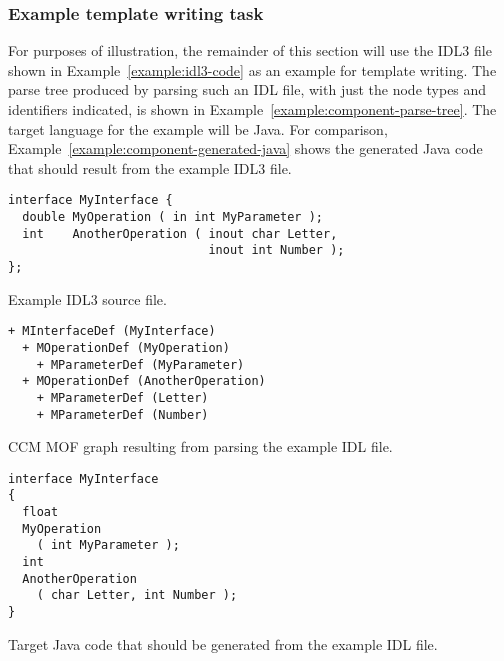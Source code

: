 \subsubsection{Example template writing task}

For purposes of illustration, the remainder of this section will use the IDL3
file shown in Example~\ref{example:idl3-code} as an example for template
writing. The parse tree produced by parsing such an IDL file, with just the node
types and identifiers indicated, is shown in
Example~\ref{example:component-parse-tree}. The target language for the example
will be Java. For comparison, Example~\ref{example:component-generated-java}
shows the generated Java code that should result from the example IDL3 file.

\begin{Example}
\begin{minifbox}
\begin{verbatim}
interface MyInterface {
  double MyOperation ( in int MyParameter );
  int    AnotherOperation ( inout char Letter,
                            inout int Number );
};
\end{verbatim}
\caption{Example IDL3 source file.}
\label{example:component-idl3-code}
\end{minifbox}
\end{Example}

\begin{Example}
\begin{minifbox}
\begin{verbatim}
+ MInterfaceDef (MyInterface)
  + MOperationDef (MyOperation)
    + MParameterDef (MyParameter)
  + MOperationDef (AnotherOperation)
    + MParameterDef (Letter)
    + MParameterDef (Number)
\end{verbatim}
\end{minifbox}
\caption{CCM MOF graph resulting from parsing the example IDL file.}
\label{example:component-parse-tree}
\end{Example}

\begin{Example}
\begin{minifbox}
\begin{verbatim}
interface MyInterface
{
  float
  MyOperation
    ( int MyParameter );
  int
  AnotherOperation
    ( char Letter, int Number );
}
\end{verbatim}
\caption{Target Java code that should be generated from the example IDL file.}
\label{example:component-generated-java}
\end{minifbox}
\end{Example}

